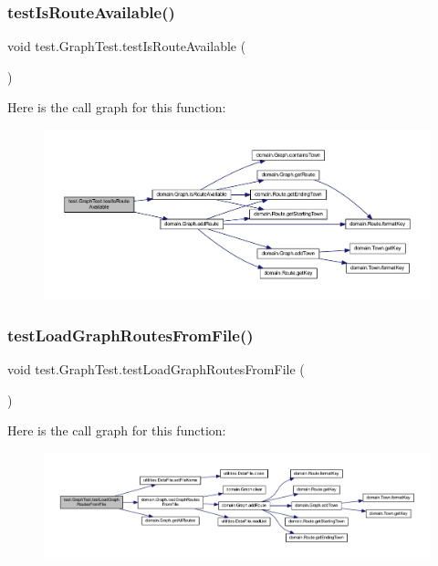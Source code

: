 \subsubsection{\texorpdfstring{test\+Is\+Route\+Available()}{testIsRouteAvailable()}}
{\footnotesize\ttfamily void test.\+Graph\+Test.\+test\+Is\+Route\+Available (\begin{DoxyParamCaption}{ }\end{DoxyParamCaption})}

Here is the call graph for this function\+:\nopagebreak
\begin{figure}[H]
\begin{center}
\leavevmode
\includegraphics[width=350pt]{classtest_1_1_graph_test_a35b38c797fb3d3c1ffc0e3ebaf9c36b2_cgraph}
\end{center}
\end{figure}
\mbox{\label{classtest_1_1_graph_test_a7ad18b1ef2adc9632a7334f1ea1aa81a}} 
\subsubsection{\texorpdfstring{test\+Load\+Graph\+Routes\+From\+File()}{testLoadGraphRoutesFromFile()}}
{\footnotesize\ttfamily void test.\+Graph\+Test.\+test\+Load\+Graph\+Routes\+From\+File (\begin{DoxyParamCaption}{ }\end{DoxyParamCaption})}

Here is the call graph for this function\+:\nopagebreak
\begin{figure}[H]
\begin{center}
\leavevmode
\includegraphics[width=350pt]{classtest_1_1_graph_test_a7ad18b1ef2adc9632a7334f1ea1aa81a_cgraph}
\end{center}
\end{figure}


